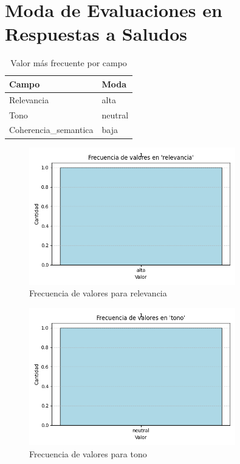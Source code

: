\documentclass{article}
\begin{document}
\section*{Moda de Evaluaciones en Respuestas a Saludos}

\begin{table}[H]
\centering
\caption{Valor más frecuente por campo}
\begin{tabularx}{0.7\textwidth}{lX}
\toprule
\textbf{Campo} & \textbf{Moda} \\
\midrule
Relevancia & alta \\
Tono & neutral \\
Coherencia_semantica & baja \\
\bottomrule
\end{tabularx}
\end{table}

\begin{figure}[H]
\centering
\includegraphics[width=0.8\textwidth]{../graficos/relevancia_frecuencias.png}
\caption{Frecuencia de valores para relevancia}
\end{figure}

\begin{figure}[H]
\centering
\includegraphics[width=0.8\textwidth]{../graficos/tono_frecuencias.png}
\caption{Frecuencia de valores para tono}
\end{figure}
\end{document}
